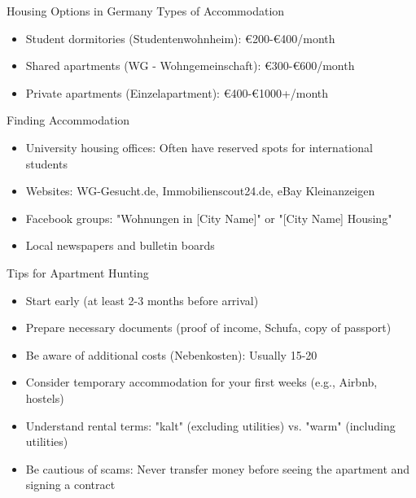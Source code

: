 \documentclass[aspectratio=169,10pt]{beamer}
\begin{document}
\begin{frame}{Housing Options in Germany}
\alert{Types of Accommodation}
\begin{itemize}
    \item Student dormitories (Studentenwohnheim): €200-€400/month
    \item Shared apartments (WG - Wohngemeinschaft): €300-€600/month
    \item Private apartments (Einzelapartment): €400-€1000+/month
\end{itemize}

\alert{Finding Accommodation}
\begin{itemize}
    \item University housing offices: Often have reserved spots for international students
    \item Websites: WG-Gesucht.de, Immobilienscout24.de, eBay Kleinanzeigen
    \item Facebook groups: "Wohnungen in [City Name]" or "[City Name] Housing"
    \item Local newspapers and bulletin boards
\end{itemize}

\alert{Tips for Apartment Hunting}
\begin{itemize}
    \item Start early (at least 2-3 months before arrival)
    \item Prepare necessary documents (proof of income, Schufa, copy of passport)
    \item Be aware of additional costs (Nebenkosten): Usually 15-20%
    \item Consider temporary accommodation for your first weeks (e.g., Airbnb, hostels)
    \item Understand rental terms: "kalt" (excluding utilities) vs. "warm" (including utilities)
    \item Be cautious of scams: Never transfer money before seeing the apartment and signing a contract
\end{itemize}
\end{frame}
\end{document}
